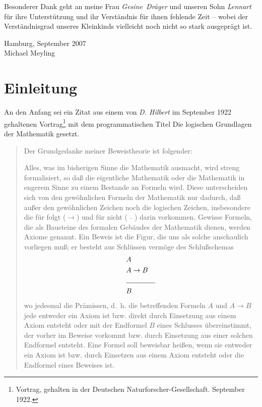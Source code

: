 \documentclass[a4paper,german,10pt,twoside]{book}
\theoremstyle{definition}
\theoremstyle{remark}
\begin{document}
\par
Besonderer Dank geht an meine Frau \emph{Gesine~Dr{\"a}ger} und unseren Sohn
\emph{Lennart} f{\"u}r ihre Unterst{\"u}tzung und ihr Verst{\"a}ndnis f{\"u}r ihnen 
fehlende Zeit -- wobei der Verst{\"a}ndnisgrad unseres Kleinkinds vielleicht 
noch nicht so stark ausgepr{\"a}gt ist.

\par
\vspace*{1cm} Hamburg, September 2007 \\
\hspace*{\fill} Michael Meyling


\chapter*{Einleitung} \label{chapter2} \hypertarget{chapter2}{}

An den Anfang sei ein Zitat aus einem von \emph{D. Hilbert} im September
1922 gehaltenen Vortrag\footnote{Vortrag, gehalten in der Deutschen 
Naturforscher-Gesellschaft. September 1922.} mit dem programmatischen 
Titel {\glqq Die logischen Grundlagen der Mathematik\grqq} gesetzt.

\par
\begin{quote} {
\glqq Der Grundgedanke meiner Beweistheorie ist folgender:
\par
Alles, was im bisherigen Sinne die Mathematik ausmacht, wird streng 
formalisiert, so da{\ss} die eigentliche Mathematik oder die Mathematik in
engerem Sinne zu einem Bestande an Formeln wird. Diese unterscheiden 
sich von den gew{\"o}hnlichen Formeln der Mathematik nur dadurch, da{\ss} au{\ss}er 
den gew{\"o}hnlichen Zeichen noch die logischen Zeichen, insbesondere die 
f{\"u}r {\glqq folgt\grqq} ($\rightarrow$) und f{\"u}r {\glqq nicht\grqq} 
($\bar{\quad}$) darin vorkommen. Gewisse Formeln, die als Bausteine des 
formalen Geb{\"a}udes der Mathematik dienen, werden Axiome genannt. Ein 
Beweis ist die Figur, die uns als solche anschaulich vorliegen mu{\ss}; er
besteht aus Schl{\"u}ssen verm{\"o}ge des Schlu{\ss}schemas\\
\begin{eqnarray*}
& A & \\
& A \rightarrow B& \\
\cline{2-3}
 & B &
\end{eqnarray*}
wo jedesmal die Pr{\"a}missen, d.~h. die betreffenden Formeln $A$ und 
$A \rightarrow B$ jede entweder ein Axiom ist bzw. direkt durch 
Einsetzung aus einem Axiom entsteht oder mit der Endformel $B$
eines Schlusses {\"u}bereinstimmt, der vorher im Beweise vorkommt bzw. 
durch Einsetzung aus einer solchen Endformel entsteht. Eine Formel soll
beweisbar hei{\ss}en, wenn sie entweder ein Axiom ist bzw. durch Einsetzen 
aus einem Axiom entsteht oder die Endformel eines Beweises ist.\grqq}
\end{quote}
\end{document}
